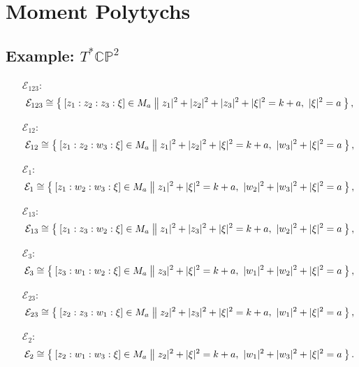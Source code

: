 \documentclass{article}
\newcommand{\PP}{\mathbb{P}}
\newcommand{\CC}{\mathbb{C}}
\newcommand{\mcE}{\mathcal{E}}
\newcommand{\norm}[1]{|#1|^{2}}
\begin{document}
	\section{Moment Polytychs}
	
	\subsection{Example: $T^{\ast}\CC\PP^{2}$}

	\begin{itemize}
		\item[$\mcE_{123}$:] 
		\[
			\mcE_{123} \cong \Set{ [z_{1}:z_{2}:z_{3}: \xi] \in M_{a} | \norm{z_{1}} + \norm{z_{2}} + \norm{z_{3}} + \norm{\xi} = k + a,\ \norm{\xi} = a },
		\]
		
		\item[$\mcE_{12}$:] 
		\[
		\mcE_{12} \cong \Set{ [z_{1}:z_{2}:w_{3}: \xi] \in M_{a} | \norm{z_{1}} + \norm{z_{2}} + \norm{\xi} = k + a,\ \norm{w_{3}} + \norm{\xi} = a },
		\]
		
		\item[$\mcE_{1}$:] 
		\[
			\mcE_{1} \cong \Set{ [z_{1}:w_{2}:w_{3}: \xi] \in M_{a} | \norm{z_{1}} + \norm{\xi} = k + a,\ \norm{w_{2}} + \norm{w_{3}} + \norm{\xi} = a },
		\]
		
		\item[$\mcE_{13}$:] 
		\[
			\mcE_{13} \cong \Set{ [z_{1}:z_{3}:w_{2}: \xi] \in M_{a} | \norm{z_{1}} + \norm{z_{3}} + \norm{\xi} = k + a,\ \norm{w_{2}} + \norm{\xi} = a },
		\]	
		
		\item[$\mcE_{3}$:] 
		\[
			\mcE_{3} \cong \Set{ [z_{3}:w_{1}:w_{2}: \xi] \in M_{a} | \norm{z_{3}} + \norm{\xi} = k + a,\ \norm{w_{1}} + \norm{w_{2}} + \norm{\xi} = a },
		\]
		
		\item[$\mcE_{23}$:] 
		\[
			\mcE_{23} \cong \Set{ [z_{2}:z_{3}:w_{1}: \xi] \in M_{a} | \norm{z_{2}} + \norm{z_{3}} + \norm{\xi} = k + a,\ \norm{w_{1}} + \norm{\xi} = a },
		\]
		
			\item[$\mcE_{2}$:] 
		\[
			\mcE_{2} \cong \Set{ [z_{2}:w_{1}:w_{3}: \xi] \in M_{a} | \norm{z_{2}} + \norm{\xi} = k + a,\ \norm{w_{1}} + \norm{w_{3}} + \norm{\xi} = a }.
		\]
	\end{itemize}
	
	
	
	
	
	
	
	
	
	
	
	
	
	
	
	
	
	
	
	
	
	
	
	  
	
	
\end{document}
